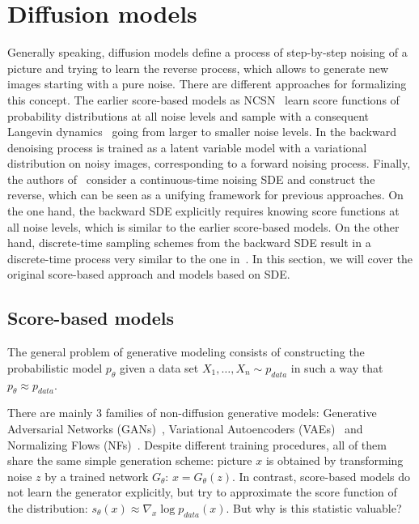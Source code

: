 \section{Diffusion models} Generally speaking, diffusion models define a process of step-by-step noising of a picture and trying to learn the reverse process, which allows to generate new images starting with a pure noise. There are different approaches for formalizing this concept. The earlier score-based models as NCSN~\cite{song2019generative} learn score functions of probability distributions at all noise levels and sample with a consequent Langevin dynamics~\cite{welling2011bayesian} going from larger to smaller noise levels. In \cite{ho2020denoising} the backward denoising process is trained as a latent variable model with a variational distribution on noisy images, corresponding to a forward noising process. Finally, the authors of~\cite{song2020score} consider a continuous-time noising SDE and construct the reverse, which can be seen as a unifying framework for previous approaches. On the one hand, the backward SDE explicitly requires knowing score functions at all noise levels, which is similar to the earlier score-based models. On the other hand, discrete-time sampling schemes from the backward SDE result in a discrete-time process very similar to the one in~\cite{ho2020denoising}. In this section, we will cover the original score-based approach and models based on SDE.

\subsection{Score-based models}
The general problem of generative modeling consists of constructing the probabilistic model $p_\theta$ given a data set $X_1, \ldots, X_n \sim p_{data}$ in such a way that $p_\theta \approx p_{data}$. 

There are mainly 3 families of non-diffusion generative models: Generative Adversarial Networks  (GANs)~\cite{goodfellow2014generative}, Variational Autoencoders (VAEs)~\cite{kingma2013auto} and Normalizing Flows (NFs)~\cite{dinh2014nice,rezende2015variational}. Despite different training procedures, all of them share the same simple generation scheme: picture $x$ is obtained by transforming noise $z$ by a trained network $G_\theta$: $x = G_\theta(z)$. In contrast, score-based models do not learn the generator explicitly, but try to approximate the score function of the distribution: $s_\theta(x) \approx \nabla_{x} \log p_{data}(x)$. But why is this statistic valuable?

